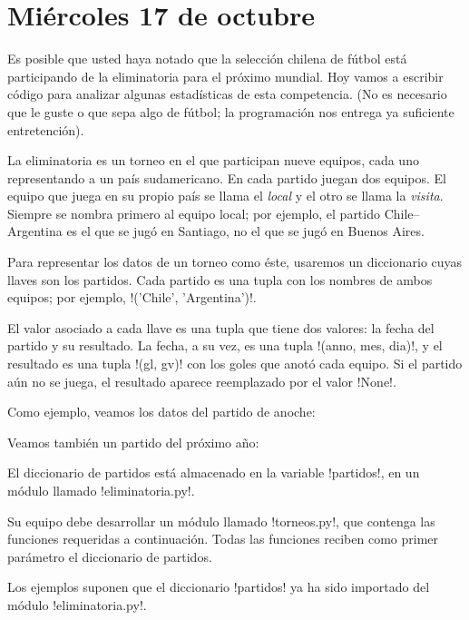 \documentclass[12pt,spanish]{article}
\begin{document}
  \thispagestyle{empty}
  \section*{Miércoles 17 de octubre}

  Es posible que usted haya notado
  que la selección chilena de fútbol
  está participando de la eliminatoria
  para el próximo mundial.
  Hoy vamos a escribir código
  para analizar algunas estadísticas de esta competencia.
  (No es necesario que le guste o que sepa algo de fútbol;
  la programación nos entrega ya suficiente entretención).

  La eliminatoria es un torneo en el que participan
  nueve equipos, cada uno representando a un país sudamericano.
  En cada partido juegan dos equipos.
  El equipo que juega en su propio país se llama el \emph{local}
  y el otro se llama la \emph{visita}.
  Siempre se nombra primero al equipo local;
  por ejemplo,
  el partido Chile--Argentina es el que se jugó en Santiago,
  no el que se jugó en Buenos Aires.

  Para representar los datos de un torneo como éste,
  usaremos un diccionario cuyas llaves son los partidos.
  Cada partido es una tupla con los nombres de ambos equipos;
  por ejemplo, \li!('Chile', 'Argentina')!.

  El valor asociado a cada llave es una tupla que tiene dos valores:
  la fecha del partido y su resultado.
  La fecha, a su vez, es una tupla \li!(anno, mes, dia)!,
  y el resultado es una tupla \li!(gl, gv)!
  con los goles que anotó cada equipo.
  Si el partido aún no se juega,
  el resultado aparece reemplazado por el valor \li!None!.

  Como ejemplo, veamos los datos del partido de anoche:
  

  Veamos también un partido del próximo año:
  

  El diccionario de partidos está almacenado
  en la variable \li!partidos!,
  en un módulo llamado \li!eliminatoria.py!.

  Su equipo debe desarrollar un módulo llamado \li!torneos.py!,
  que contenga las funciones requeridas a continuación.
  Todas las funciones reciben como primer parámetro
  el diccionario de partidos.

  Los ejemplos suponen que el diccionario \li!partidos!
  ya ha sido importado del módulo \li!eliminatoria.py!.
  \newpage
\end{document}
